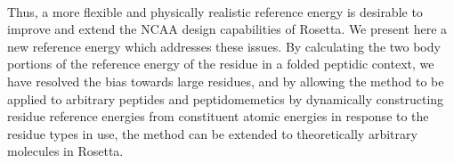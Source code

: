 \paragraph{}
Thus, a more flexible and physically realistic reference energy is desirable to improve and extend the NCAA design capabilities of Rosetta. We present here a new reference energy which addresses these issues. By calculating the two body portions of the reference energy of the residue in a folded peptidic context, we have resolved the bias towards large residues, and by allowing the method to be applied to arbitrary peptides and peptidomemetics by dynamically constructing residue reference energies from constituent atomic energies in response to the residue types in use, the method can be extended to theoretically arbitrary molecules in Rosetta.


